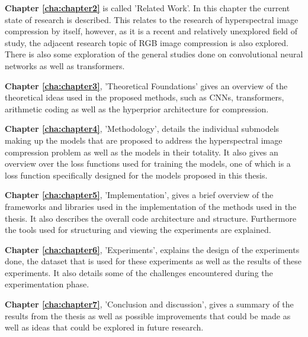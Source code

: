 \textbf{Chapter \ref{cha:chapter2}} is called 'Related Work'. In this chapter the current state of research is described. This relates to the research of hyperspectral image compression by itself, however, as it is a recent and relatively unexplored field of study, the adjacent research topic of RGB image compression is also explored. There is also some exploration of the general studies done on convolutional neural networks as well as transformers.

\textbf{Chapter \ref{cha:chapter3}}, 'Theoretical Foundations' gives an overview of the theoretical ideas used in the proposed methods, such as CNNs, transformers, arithmetic coding as well as the hyperprior architecture for compression.

\textbf{Chapter \ref{cha:chapter4}}, 'Methodology', details the individual submodels making up the models that are proposed to address the hyperspectral image compression problem as well as the models in their totality. It also gives an overview over the loss functions used for training the models, one of which is a loss function specifically designed for the models proposed in this thesis.

\textbf{Chapter \ref{cha:chapter5}}, 'Implementation', gives a brief overview of the frameworks and libraries used in the implementation of the methods used in the thesis. It also describes the overall code architecture and structure. Furthermore the tools used for structuring and viewing the experiments are explained.

\textbf{Chapter \ref{cha:chapter6}}, 'Experiments', explains the design of the experiments done, the dataset that is used for these experiments as well as the results of these experiments. It also details some of the challenges encountered during the experimentation phase.

\textbf{Chapter \ref{cha:chapter7}}, 'Conclusion and discussion', gives a summary of the results from the thesis as well as possible improvements that could be made as well as ideas that could be explored in future research.